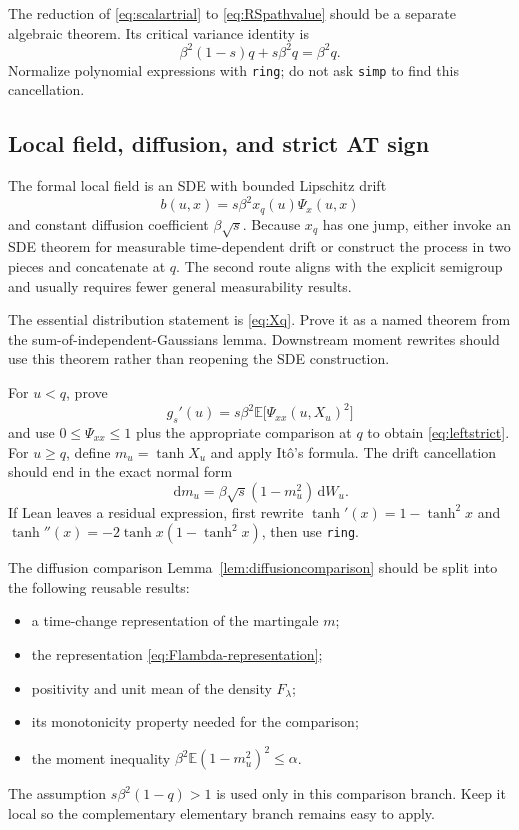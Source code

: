 \documentclass[11pt]{article}
\numberwithin{equation}{section}
\newcommand{\E}{\mathbb{E}}
\newcommand{\1}{\mathbf 1}
\newcommand{\dd}{\,\mathrm d}
\begin{document}
The reduction of \eqref{eq:scalartrial} to \eqref{eq:RSpathvalue} should be
a separate algebraic theorem.  Its critical variance identity is
\[
 \beta^2(1-s)q+s\beta^2q=\beta^2q.
\]
Normalize polynomial expressions with \texttt{ring}; do not ask
\texttt{simp} to find this cancellation.

\subsection{Local field, diffusion, and strict AT sign}

The formal local field is an SDE with bounded Lipschitz drift
\[
 b(u,x)=s\beta^2x_q(u)\Psi_x(u,x)
\]
and constant diffusion coefficient $\beta\sqrt s$.  Because $x_q$ has one
jump, either invoke an SDE theorem for measurable time-dependent drift or
construct the process in two pieces and concatenate at $q$.  The second
route aligns with the explicit semigroup and usually requires fewer general
measurability results.

The essential distribution statement is \eqref{eq:Xq}.  Prove it as a
named theorem from the sum-of-independent-Gaussians lemma.  Downstream
moment rewrites should use this theorem rather than reopening the SDE
construction.

For $u<q$, prove
\[
 g_s'(u)=s\beta^2\E\bigl[\Psi_{xx}(u,X_u)^2\bigr]
\]
and use $0\le\Psi_{xx}\le1$ plus the appropriate comparison at $q$ to obtain
\eqref{eq:leftstrict}.  For $u\ge q$, define $m_u=\tanh X_u$ and apply
It\^o's formula.  The drift cancellation should end in the exact normal form
\[
 \dd m_u=\beta\sqrt s(1-m_u^2)\dd W_u.
\]
If Lean leaves a residual expression, first rewrite
$\tanh'(x)=1-\tanh^2x$ and
$\tanh''(x)=-2\tanh x(1-\tanh^2x)$, then use \texttt{ring}.

The diffusion comparison Lemma~\ref{lem:diffusioncomparison} should be split
into the following reusable results:
\begin{itemize}[leftmargin=2em]
\item a time-change representation of the martingale $m$;
\item the representation \eqref{eq:Flambda-representation};
\item positivity and unit mean of the density $F_\lambda$;
\item its monotonicity property needed for the comparison;
\item the moment inequality
      $\beta^2\E(1-m_u^2)^2\le\alpha$.
\end{itemize}
The assumption $s\beta^2(1-q)>1$ is used only in this comparison branch.
Keep it local so the complementary elementary branch remains easy to apply.
\end{document}
